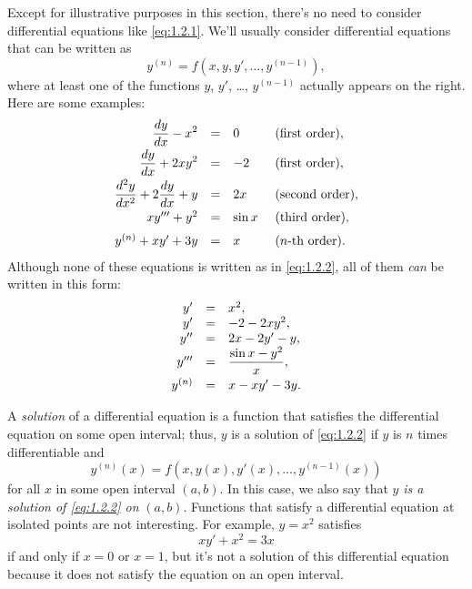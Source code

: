 Except for illustrative purposes in this section, there's no need to consider differential equations
like \eqref{eq:1.2.1}. We'll usually consider differential equations that can be written as
\begin{equation}
  \label{eq:1.2.2}y^{(n)}=f(x,y,y',\dots,y^{(n-1)}),
\end{equation}
where at least one of the functions $y$, $y'$, \dots, $y^{(n-1)}$ actually appears on the right.
Here are some examples:
\[
  \begin{array}{rcll}
    \displaystyle\frac{dy}{dx}-x^{2}                        & = & 0      & \mbox{ (first order)},  \\[2\jot]
    \displaystyle\frac{dy}{dx}+2xy^{2}                      & = & -2     & \mbox{ (first order)},  \\[2\jot]
    \displaystyle\frac{d^{2}y}{dx^{2}}+2\displaystyle\frac{dy}{dx}+y & = & 2x     & \mbox{ (second order)}, \\[2\jot]
    xy'''+y^{2}                                    & = & \sin x & \mbox{ (third order)},  \\[2\jot]
    y^{(n)}+xy'+3y                                 & = & x      & \mbox{ ($n$-th order)}.
  \end{array}
\]
Although none of these equations is written as in \eqref{eq:1.2.2}, all of them {\color{blue}\it
can\/} be written in this form:
\[
  \begin{array}{rcl}
    y'      & = & x^{2},                      \\
    y'      & = & -2-2xy^{2},                 \\
    y''     & = & 2x-2y'-y,                   \\
    y'''    & = & \displaystyle\frac{\sin x-y^{2}}{x}, \\[2\jot]
    y^{(n)} & = & x-xy'-3y.
  \end{array}
\]


\noindent
A {\color{blue}\it solution\/} of a differential equation is a function that satisfies the
differential equation on some open interval; thus, $y$ is a solution of \eqref{eq:1.2.2} if $y$ is
$n$ times differentiable and
\[
  y^{(n)}(x)=f(x,y(x),y'(x),\dots,y^{(n-1)}(x))
\]
for all $x$ in some open interval $(a,b)$. In this case, we also say that $y$ {\color{blue}\it is a
solution of \eqref{eq:1.2.2} on\/} $(a,b)$. Functions that satisfy a differential equation at
isolated points are not interesting. For example, $y=x^{2}$ satisfies
\[
  xy'+x^{2}=3x
\]
if and only if $x=0$ or $x=1$, but it's not a solution of this differential equation because it does
not satisfy the equation on an open interval.

